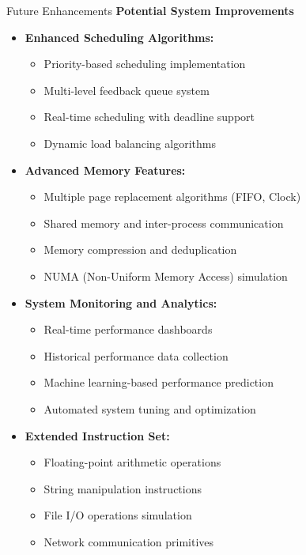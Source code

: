 \documentclass[10pt]{beamer}
\begin{document}
\begin{frame}{Future Enhancements}
    \textbf{Potential System Improvements}
    
    \begin{itemize}
        \item \textbf{Enhanced Scheduling Algorithms:}
        \begin{itemize}
            \item Priority-based scheduling implementation
            \item Multi-level feedback queue system
            \item Real-time scheduling with deadline support
            \item Dynamic load balancing algorithms
        \end{itemize}
        
        \item \textbf{Advanced Memory Features:}
        \begin{itemize}
            \item Multiple page replacement algorithms (FIFO, Clock)
            \item Shared memory and inter-process communication
            \item Memory compression and deduplication
            \item NUMA (Non-Uniform Memory Access) simulation
        \end{itemize}
        
        \item \textbf{System Monitoring and Analytics:}
        \begin{itemize}
            \item Real-time performance dashboards
            \item Historical performance data collection
            \item Machine learning-based performance prediction
            \item Automated system tuning and optimization
        \end{itemize}
        
        \item \textbf{Extended Instruction Set:}
        \begin{itemize}
            \item Floating-point arithmetic operations
            \item String manipulation instructions
            \item File I/O operations simulation
            \item Network communication primitives
        \end{itemize}
    \end{itemize}
\end{frame}
\end{document}
